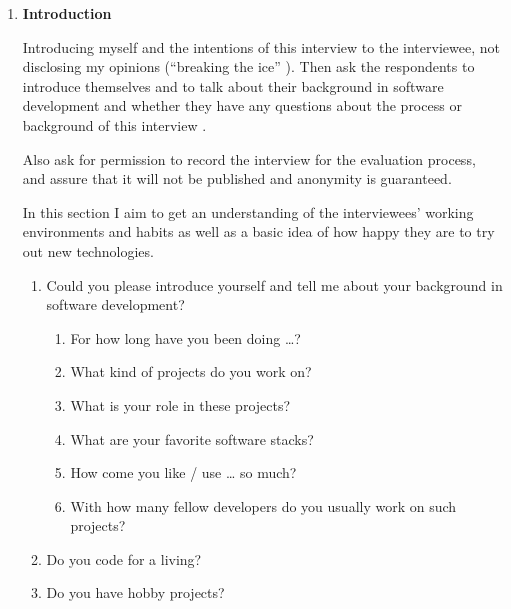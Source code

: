 \begin{enumerate}

	\item \textbf{Introduction}

	Introducing myself and the intentions of this interview to the interviewee, not disclosing my opinions (\enquote{breaking the ice} \cite[p. 83]{berg01}). Then ask the respondents to introduce themselves and to talk about their background in software development and whether they have any questions about the process or background of this interview \cite[p. 83]{berg01}.

	Also ask for permission to record the interview for the evaluation process, and assure that it will not be published and anonymity is guaranteed.

	In this section I aim to get an understanding of the interviewees' working environments and habits as well as a basic idea of how happy they are to try out new technologies.

	\begin{enumerate}

		\item Could you please introduce yourself and tell me about your background in software development?

		\begin{enumerate}

			\item For how long have you been doing …?

			\item What kind of projects do you work on?

			\item What is your role in these projects?

			\item What are your favorite software stacks?

			\item How come you like / use … so much?

			\item With how many fellow developers do you usually work on such projects?

		\end{enumerate}

		\item Do you code for a living?

		\item Do you have hobby projects?

	\end{enumerate}


\end{enumerate}

